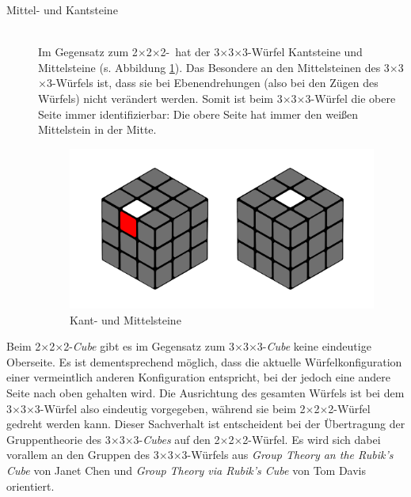 \documentclass[12pt,a4paper, usenames, dvipsnames]{article}
\theoremstyle{mystyle}
\theoremstyle{definition}
\newcommand{\Ttwo}{2$\times$2$\times$2-}
\newcommand{\Tthree}{3$\times$3$\times$3-}
\begin{document}
\begin{description}
\newpage
\item[Mittel- und Kantsteine] \ \\
Im Gegensatz zum \Ttwo \ hat der \Tthree Würfel Kantsteine und Mittelsteine (s. Abbildung \ref{Abbildung_MittelKantSteine}).
Das Besondere an den Mittelsteinen des \Tthree Würfels ist, dass sie bei Ebenendrehungen (also bei den Zügen des Würfels) nicht verändert werden. Somit ist beim \Tthree Würfel die obere Seite immer identifizierbar: Die obere Seite hat immer den weißen Mittelstein in der Mitte. 
\begin{figure}[H]
\centering
\includegraphics[scale=0.11]{mittelkant.png}
\caption[Kant- und Mittelsteine]{Kant- und Mittelsteine}
\label{Abbildung_MittelKantSteine}
\end{figure}



\end{description}

Beim \Ttwo \textit{Cube} gibt es im Gegensatz zum \Tthree \textit{Cube} keine eindeutige Oberseite. Es ist dementsprechend möglich, dass die aktuelle Würfelkonfiguration einer vermeintlich anderen Konfiguration entspricht, bei der jedoch eine andere Seite nach oben gehalten wird.
Die Ausrichtung des gesamten Würfels ist bei dem \Tthree Würfel also eindeutig vorgegeben, während sie beim \Ttwo Würfel gedreht werden kann.  
Dieser Sachverhalt ist entscheident bei der Übertragung der Gruppentheorie des \Tthree \textit{Cubes} auf den \Ttwo Würfel. Es wird sich dabei vorallem an den Gruppen des \Tthree Würfels aus \textit{Group Theory an the Rubik's Cube} von Janet Chen \cite{JC} und \textit{Group Theory via Rubik's Cube} von Tom Davis \cite{TD} orientiert.

%
%
%
%
%
%
%
%
%
%
%
%
%
\end{document}

